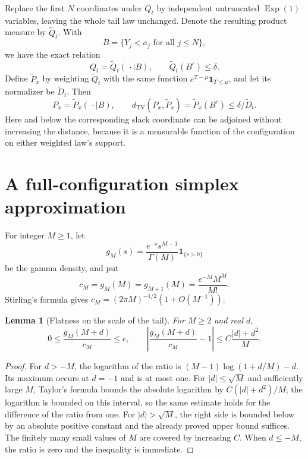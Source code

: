 \documentclass[11pt,letterpaper]{article}
\numberwithin{equation}{section}
\newtheorem{lemma}[theorem]{Lemma}
\theoremstyle{definition}
\theoremstyle{remark}
\newcommand{\ind}{\mathbf 1}
\newcommand{\TV}{d_{\mathrm{TV}}}
\newcommand{\Exp}{\operatorname{Exp}}
\begin{document}
Replace the first $N$ coordinates under $Q_t$ by independent untruncated
$\Exp(1)$ variables, leaving the whole tail law unchanged. Denote the resulting
product measure by $\widetilde Q_t$. With
\[
 B=\{Y_j<a_j\text{ for all }j\le N\},
\]
we have the exact relation
\begin{equation}
 Q_t=\widetilde Q_t(\,\cdot\mid B),\qquad
 \widetilde Q_t(B^c)\le\delta.
 \label{eq:capcondition}
\end{equation}
Define $\widetilde P_x$ by weighting $\widetilde Q_t$ with the same function
$e^{T-\mu}\ind_{T\le\mu}$, and let its normalizer be $\widetilde D_t$.
Then
\begin{equation}
 P_x=\widetilde P_x(\,\cdot\mid B),\qquad
 \TV(P_x,\widetilde P_x)
 =\widetilde P_x(B^c)\le\delta/\widetilde D_t.
 \label{eq:weightedcap}
\end{equation}
Here and below the corresponding slack coordinate can be adjoined without
increasing the distance, because it is a measurable function of the configuration
on either weighted law's support.

\section{A full-configuration simplex approximation}
\label{sec:global}

For integer $M\ge1$, let
\[
 g_M(s)=\frac{e^{-s}s^{M-1}}{\Gamma(M)}\ind_{\{s>0\}}
\]
be the gamma density, and put
\[
 c_M=g_M(M)=g_{M+1}(M)=\frac{e^{-M}M^M}{M!}.
\]
Stirling's formula gives $c_M=(2\pi M)^{-1/2}(1+O(M^{-1}))$.

\begin{lemma}[Flatness on the scale of the tail]
\label{lem:flat}
For $M\ge2$ and real $d$,
\begin{equation}
 0\le\frac{g_M(M+d)}{c_M}\le e,\qquad
 \left|\frac{g_M(M+d)}{c_M}-1\right|
 \le C\frac{|d|+d^2}{M}.
 \label{eq:flat}
\end{equation}
\end{lemma}
\begin{proof}
For $d>-M$, the logarithm of the ratio is
$(M-1)\log(1+d/M)-d$. Its maximum occurs at $d=-1$ and is at most one.
For $|d|\le\sqrt M$ and sufficiently large $M$, Taylor's formula bounds the
absolute logarithm by $C(|d|+d^2)/M$; the logarithm is bounded on this interval,
so the same estimate holds for the difference of the ratio from one.
For $|d|>\sqrt M$, the right side is bounded below by an absolute positive
constant and the already proved upper bound suffices. The finitely many
small values of $M$ are covered by increasing $C$. When $d\le-M$, the ratio
is zero and the inequality is immediate.
\end{proof}
\end{document}
